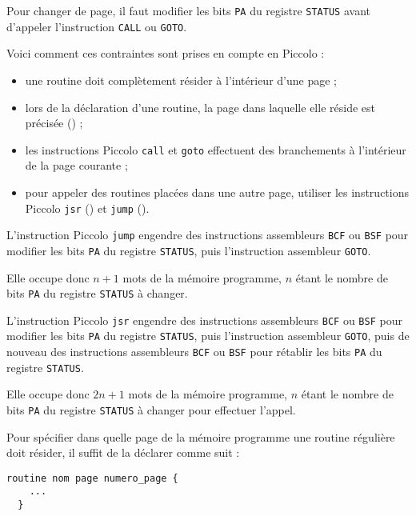 Pour changer de page, il faut modifier les bits \texttt{PA} du registre \texttt{STATUS} avant d'appeler l'instruction \texttt{CALL} ou \texttt{GOTO}.

Voici comment ces contraintes sont prises en compte en Piccolo :
\begin{itemize}
  \item une routine doit complètement résider à l'intérieur d'une page ;
  \item lors de la déclaration d'une routine, la page dans laquelle elle réside est précisée () ;
  \item les instructions Piccolo \texttt{call} et \texttt{goto} effectuent des branchements à l'intérieur de la page courante ;
  \item pour appeler des routines placées dans une autre page, utiliser les instructions Piccolo \texttt{jsr} () et \texttt{jump} ().
\end{itemize}




L'instruction Piccolo  \texttt{jump} engendre des instructions assembleurs \texttt{BCF} ou \texttt{BSF} pour modifier les bits \texttt{PA} du registre \texttt{STATUS}, puis l'instruction assembleur \texttt{GOTO}.

Elle occupe donc $n+1$ mots de la mémoire programme, $n$ étant le nombre de bits \texttt{PA} du registre \texttt{STATUS} à changer.





L'instruction Piccolo  \texttt{jsr} engendre des instructions assembleurs \texttt{BCF} ou \texttt{BSF} pour modifier les bits \texttt{PA} du registre \texttt{STATUS}, puis l'instruction assembleur \texttt{GOTO}, puis de nouveau des instructions assembleurs \texttt{BCF} ou \texttt{BSF} pour rétablir les bits \texttt{PA} du registre \texttt{STATUS}.

Elle occupe donc $2n+1$ mots de la mémoire programme, $n$ étant le nombre de bits \texttt{PA} du registre \texttt{STATUS} à changer pour effectuer l'appel.


Pour spécifier dans quelle page de la mémoire programme une routine régulière doit résider, il suffit de la déclarer comme suit :
\begin{lstlisting}[language=piccolo]
  routine nom page numero_page {
    ...
  }
\end{lstlisting}

